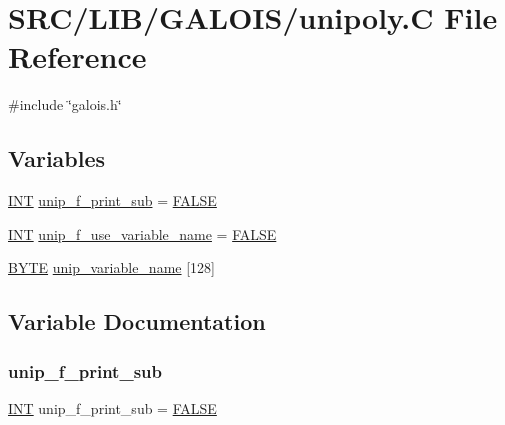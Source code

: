 \hypertarget{_g_a_l_o_i_s_2unipoly_8_c}{}\section{S\+R\+C/\+L\+I\+B/\+G\+A\+L\+O\+I\+S/unipoly.C File Reference}
\label{_g_a_l_o_i_s_2unipoly_8_c}
{\ttfamily \#include \char`\"{}galois.\+h\char`\"{}}\newline
\subsection*{Variables}
\begin{DoxyCompactItemize}
\item 
\mbox{\hyperlink{galois_8h_a09fddde158a3a20bd2dcadb609de11dc}{I\+NT}} \mbox{\hyperlink{_g_a_l_o_i_s_2unipoly_8_c_ae0f0c8801dba2ad348b03493c928c733}{unip\+\_\+f\+\_\+print\+\_\+sub}} = \mbox{\hyperlink{nauty_8h_aa93f0eb578d23995850d61f7d61c55c1}{F\+A\+L\+SE}}
\item 
\mbox{\hyperlink{galois_8h_a09fddde158a3a20bd2dcadb609de11dc}{I\+NT}} \mbox{\hyperlink{_g_a_l_o_i_s_2unipoly_8_c_ad4f9b1efe1c95983b734e1d7feacc424}{unip\+\_\+f\+\_\+use\+\_\+variable\+\_\+name}} = \mbox{\hyperlink{nauty_8h_aa93f0eb578d23995850d61f7d61c55c1}{F\+A\+L\+SE}}
\item 
\mbox{\hyperlink{galois_8h_ab6cc7b4aeb6ea31aba2b3fbfc83ff5e6}{B\+Y\+TE}} \mbox{\hyperlink{_g_a_l_o_i_s_2unipoly_8_c_a6a07b9900672fad021466f1ab3162873}{unip\+\_\+variable\+\_\+name}} \mbox{[}128\mbox{]}
\end{DoxyCompactItemize}


\subsection{Variable Documentation}
\mbox{\label{_g_a_l_o_i_s_2unipoly_8_c_ae0f0c8801dba2ad348b03493c928c733}} 
\subsubsection{\texorpdfstring{unip\+\_\+f\+\_\+print\+\_\+sub}{unip\_f\_print\_sub}}
{\footnotesize\ttfamily \mbox{\hyperlink{galois_8h_a09fddde158a3a20bd2dcadb609de11dc}{I\+NT}} unip\+\_\+f\+\_\+print\+\_\+sub = \mbox{\hyperlink{nauty_8h_aa93f0eb578d23995850d61f7d61c55c1}{F\+A\+L\+SE}}}

